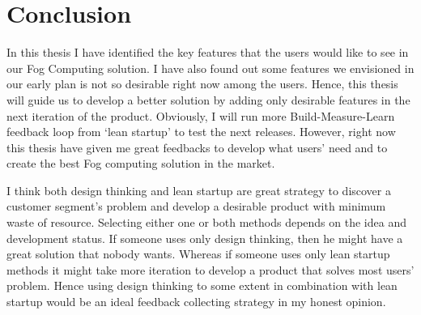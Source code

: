 \section{Conclusion}
In this thesis I have identified the key features that the users would like to see in our Fog Computing solution. I have also found out some features we envisioned in our early plan is not so desirable right now among the users. Hence, this thesis will guide us to develop a better solution by adding only desirable features in the next iteration of the product. Obviously, I will run more Build-Measure-Learn feedback loop from `lean startup' to test the next releases. However, right now this thesis have given me great feedbacks to develop what users' need and to create the best Fog computing solution in the market.

I think both design thinking and lean startup are great strategy to discover a customer segment's problem and develop a desirable product with minimum waste of resource. Selecting either one or both methods depends on the idea and development status. If someone uses only design thinking, then he might have a great solution that nobody wants. Whereas if someone uses only lean startup methods it might take more iteration to develop a product that solves most users' problem. Hence using design thinking to some extent in combination with lean startup would be an ideal feedback collecting strategy in my honest opinion. 





